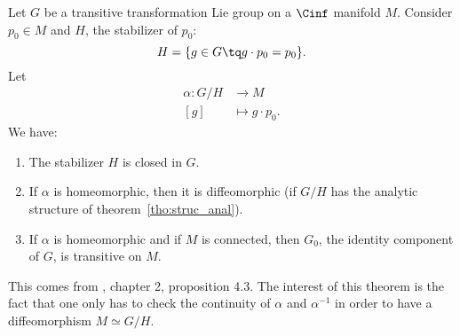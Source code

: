 \begin{proposition}
Let $G$ be a transitive transformation Lie group on a $\Cinf$ manifold $M$. Consider $p_0\in M$ and $H$, the stabilizer of $p_{0}$:
\[
  H=\{ g\in G\tq g\cdot p_0=p_0 \}.
\]
Let
\begin{equation}
\begin{aligned}
 \alpha\colon G/H&\to M \\
[g]&\mapsto g\cdot p_{0}.
\end{aligned}
\end{equation}
We have:
\begin{enumerate}
\item The stabilizer $H$ is closed in $G$.
\item If $\alpha$ is homeomorphic, then it is diffeomorphic (if $G/H$ has the analytic structure of theorem~\ref{tho:struc_anal}).
\item If $\alpha$ is homeomorphic and if $M$ is connected, then $G_0$, the identity component of $G$, is transitive on $M$.
\end{enumerate}
\label{propHelgason4.3}
\end{proposition}

This comes from \cite{Helgason}, chapter 2, proposition 4.3. The interest of this theorem is the fact that one only has to check the continuity of $\alpha$ and $\alpha^{-1}$ in order to have a diffeomorphism $M\simeq G/H$.

